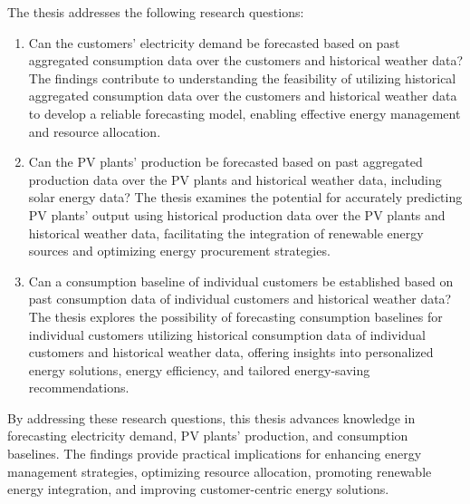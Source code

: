 
The thesis addresses the following research questions:
\begin{enumerate}
  \item Can the customers' electricity demand be forecasted based on past aggregated consumption data over the customers and historical weather data? The findings contribute to understanding the feasibility of utilizing historical aggregated consumption data over the customers and historical weather data to develop a reliable forecasting model, enabling effective energy management and resource allocation.
  \item Can the PV plants' production be forecasted based on past aggregated production data over the PV plants and historical weather data, including solar energy data? The thesis examines the potential for accurately predicting PV plants' output using historical production data over the PV plants and historical weather data, facilitating the integration of renewable energy sources and optimizing energy procurement strategies.
  \item Can a consumption baseline of individual customers be established based on past consumption data of individual customers and historical weather data? The thesis explores the possibility of forecasting consumption baselines for individual customers utilizing historical consumption data of individual customers and historical weather data, offering insights into personalized energy solutions, energy efficiency, and tailored energy-saving recommendations.
\end{enumerate}
By addressing these research questions, this thesis advances knowledge in forecasting electricity demand, PV plants' production, and consumption baselines.
The findings provide practical implications for enhancing energy management strategies, optimizing resource allocation, promoting renewable energy integration, and improving customer-centric energy solutions.



